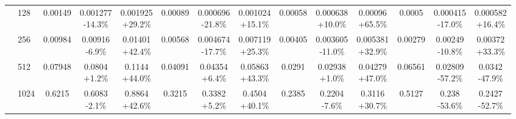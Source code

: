 \documentclass[acmlarge]{acmart}
\begin{document}
\begin{table}[htbp]
\begin{tabular}{llcccccccccccc}
 & 128 & 0.00149 & \makecell{0.001277\\{\scriptsize -14.3\%}} & \makecell{0.001925\\{\scriptsize +29.2\%}} & 0.00089 & \makecell{0.000696\\{\scriptsize -21.8\%}} & \makecell{0.001024\\{\scriptsize +15.1\%}} & 0.00058 & \makecell{0.000638\\{\scriptsize +10.0\%}} & \makecell{0.00096\\{\scriptsize +65.5\%}} & 0.0005 & \makecell{0.000415\\{\scriptsize -17.0\%}} & \makecell{0.000582\\{\scriptsize +16.4\%}} \\
 & 256 & 0.00984 & \makecell{0.00916\\{\scriptsize -6.9\%}} & \makecell{0.01401\\{\scriptsize +42.4\%}} & 0.00568 & \makecell{0.004674\\{\scriptsize -17.7\%}} & \makecell{0.007119\\{\scriptsize +25.3\%}} & 0.00405 & \makecell{0.003605\\{\scriptsize -11.0\%}} & \makecell{0.005381\\{\scriptsize +32.9\%}} & 0.00279 & \makecell{0.00249\\{\scriptsize -10.8\%}} & \makecell{0.00372\\{\scriptsize +33.3\%}} \\
 & 512 & 0.07948 & \makecell{0.0804\\{\scriptsize +1.2\%}} & \makecell{0.1144\\{\scriptsize +44.0\%}} & 0.04091 & \makecell{0.04354\\{\scriptsize +6.4\%}} & \makecell{0.05863\\{\scriptsize +43.3\%}} & 0.0291 & \makecell{0.02938\\{\scriptsize +1.0\%}} & \makecell{0.04279\\{\scriptsize +47.0\%}} & 0.06561 & \makecell{0.02809\\{\scriptsize -57.2\%}} & \makecell{0.0342\\{\scriptsize -47.9\%}} \\
 & 1024 & 0.6215 & \makecell{0.6083\\{\scriptsize -2.1\%}} & \makecell{0.8864\\{\scriptsize +42.6\%}} & 0.3215 & \makecell{0.3382\\{\scriptsize +5.2\%}} & \makecell{0.4504\\{\scriptsize +40.1\%}} & 0.2385 & \makecell{0.2204\\{\scriptsize -7.6\%}} & \makecell{0.3116\\{\scriptsize +30.7\%}} & 0.5127 & \makecell{0.238\\{\scriptsize -53.6\%}} & \makecell{0.2427\\{\scriptsize -52.7\%}} \\
\bottomrule
\end{tabular}
\end{table}
\end{document}
